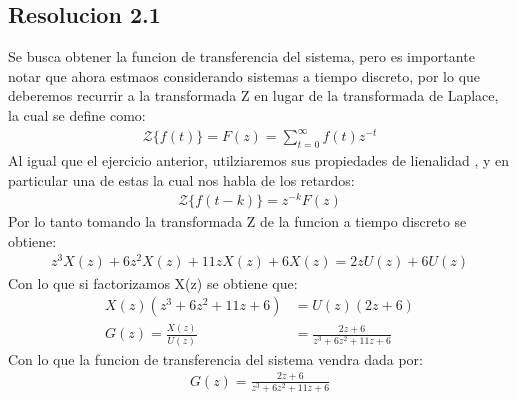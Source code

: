 \documentclass[
  11pt,
  letterpaper,
   addpoints,
   answers
  ]{exam}
\begin{document}
\begin{questions}
\begin{solution}
        \subsection*{Resolucion 2.1}
        Se busca obtener la funcion de transferencia del sistema, pero es importante notar que ahora estmaos considerando sistemas a tiempo discreto, por lo que deberemos recurrir a la transformada Z en lugar de la transformada de Laplace, la cual se define como:
        \begin{align}
            \mathcal{Z}\{f(t)\} = F(z) = \sum_{t=0}^{\infty} f(t)z^{-t}
        \end{align}
        Al igual que el ejercicio anterior, utilziaremos sus propiedades de lienalidad , y en particular una de estas la cual nos habla de los retardos:
        \begin{align}
            \mathcal{Z}\{f(t-k)\} = z^{-k}F(z)
        \end{align}
        Por lo tanto tomando la transformada Z de la funcion a tiempo discreto se obtiene:
        \begin{align}
            z^{3}X(z) + 6z^{2}X(z) + 11zX(z) + 6X(z) = 2zU(z) + 6U(z)
        \end{align}
        Con lo que si factorizamos X(z) se obtiene que:
        \begin{align}
        X(z)(z^{3} + 6z^{2} + 11z + 6) &= U(z)(2z + 6)\\
        G(z)=\frac{X(z)}{U(z)}&= \frac{2z+6}{z^{3} + 6z^{2} + 11z + 6}
        \end{align}
        Con lo que la funcion de transferencia del sistema vendra dada por:
        \begin{align}
            G(z) = \frac{2z+6}{z^{3} + 6z^{2} + 11z + 6}
        \end{align}

\end{solution}
\end{questions}
\end{document}
